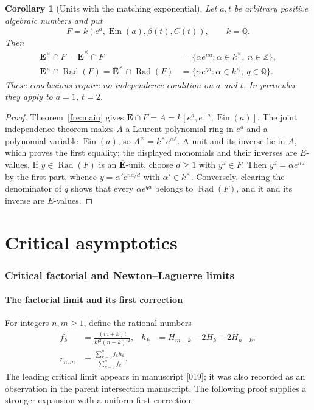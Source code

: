 \documentclass[11pt]{article}
\newtheorem{corollary}[theorem]{Corollary}
\theoremstyle{definition}
\theoremstyle{remark}
\newcommand{\E}{\mathbf E}
\newcommand{\Ebar}{\overline{\mathbf E}}
\newcommand{\Ein}{\operatorname{Ein}}
\begin{document}
\begin{corollary}[Units with the matching exponential]
\label{unit:matching-exponential}
Let $a,t$ be arbitrary positive algebraic numbers and put
\[
 F=k(e^a,\Ein(a),\beta(t),C(t)),\qquad k=\overline{\mathbb Q}.
\]
Then
\begin{align*}
 \E^\times\cap F=\Ebar^\times\cap F
   &=\{\alpha e^{na}:\alpha\in k^\times,\ n\in\mathbb Z\},\\
 \E^\times\cap\operatorname{Rad}(F)
   =\Ebar^\times\cap\operatorname{Rad}(F)
   &=\{\alpha e^{qa}:\alpha\in k^\times,\ q\in\mathbb Q\}.
\end{align*}
These conclusions require no independence condition on $a$ and $t$.
In particular they apply to $a=1$, $t=2$.
\end{corollary}
\begin{proof}
Theorem~\ref{fre:main} gives
$\Ebar\cap F=A=k[e^a,e^{-a},\Ein(a)]$.
The joint independence theorem makes $A$ a Laurent polynomial ring
in $e^a$ and a polynomial variable $\Ein(a)$, so
$A^\times=k^\times e^{a\mathbb Z}$.
A unit and its inverse lie in $A$, which proves the first equality;
the displayed monomials and their inverses are $E$-values.
If $y\in\operatorname{Rad}(F)$ is an $\Ebar$-unit, choose $d\ge1$
with $y^d\in F$. Then $y^d=\alpha e^{na}$ by the first part, whence
$y=\alpha' e^{na/d}$ with $\alpha'\in k^\times$.
Conversely, clearing the denominator of $q$ shows that every
$\alpha e^{qa}$ belongs to $\operatorname{Rad}(F)$, and it and its
inverse are $E$-values.
\end{proof}


\part{Critical asymptotics}
\section{Critical factorial and Newton--Laguerre limits}\label{sec:limits}
\subsection{The factorial limit and its first correction}
For integers $n,m\ge1$, define the rational numbers
\begin{align}
f_k&=\frac{(m+k)!}{k!^2(n-k)!^2},&
h_k&=H_{m+k}-2H_k+2H_{n-k},\nonumber\\
r_{n,m}&=\frac{\sum_{k=0}^nf_kh_k}{\sum_{k=0}^nf_k}.\label{eq:r}
\end{align}
The leading critical limit appears in manuscript [019]\cite{Source019};
it was also recorded as an observation in the parent intersection manuscript.
The following proof supplies a stronger expansion with a uniform first correction.
\end{document}
